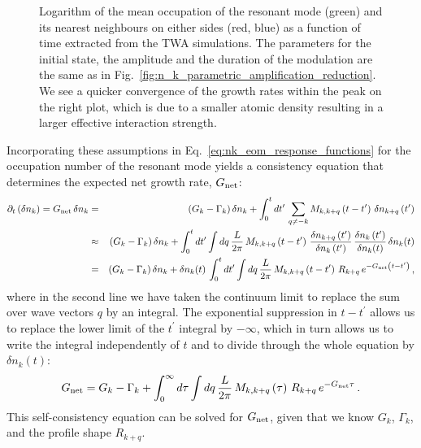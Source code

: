 \documentclass[aps,prd,notitlepage,amsfonts,amssymb,amsmath,nofootinbib,superscriptaddress,longbibliography]{revtex4-2}
\begin{document}
\begin{appendices}
\begin{figure}
\begin{minipage}{0.49\textwidth}
    \end{minipage}
    \caption{
    Logarithm of the mean occupation of the resonant mode (green) and its nearest neighbours on either sides (red, blue) as a function of time extracted from the TWA simulations. The parameters for the initial state, the amplitude and the duration of the modulation are the same as in Fig.~\ref{fig:n_k_parametric_amplification_reduction}. We see a quicker convergence of the growth rates within the peak on the right plot, which is due to a smaller atomic density resulting in a larger effective interaction strength.
    \label{fig:log_nk_different_asap}
    }
\end{figure}


Incorporating these assumptions in Eq.~\eqref{eq:nk_eom_response_functions} for the occupation number of the resonant mode yields a consistency equation that determines the expected net growth rate, $G_{\rm net}$:
\begin{eqnarray}
    \partial_{t}\left(\delta n_{k}\right) = G_{\rm net} \, \delta n_{k} &=& \left( G_{k} - \Gamma_{k} \right) \delta n_{k} + \int_{0}^{t} dt^{\prime} \, \sum_{q \neq -k} M_{k,k+q}\left(t-t^{\prime}\right) \, \delta n_{k+q}\left(t^{\prime}\right) \nonumber \\
    &\approx& \left(G_{k}-\Gamma_{k}\right) \delta n_{k} + \int_{0}^{t} dt^{\prime} \int dq \, \frac{L}{2\pi} \, M_{k,k+q}\left(t-t^{\prime}\right) \, \frac{\delta n_{k+q}\left(t^{\prime}\right)}{\delta n_{k}\left(t^{\prime}\right)} \, \frac{\delta n_{k}\left(t^{\prime}\right)}{\delta n_{k}(t)} \, \delta n_{k}(t) \nonumber \\
    &=& \left(G_{k}-\Gamma_{k}\right) \delta n_{k} + \delta n_{k}(t) \, \int_{0}^{t} dt^{\prime} \int dq \, \frac{L}{2\pi} \, M_{k,k+q}\left(t-t^{\prime}\right) \, R_{k+q} \, e^{-G_{\rm net}\left(t-t^{\prime}\right)} \,,
\end{eqnarray}
where in the second line we have taken the continuum limit to replace the sum over wave vectors $q$ by an integral.  The exponential suppression in $t-t^{\prime}$ allows us to replace the lower limit of the $t^{\prime}$ integral by $-\infty$, which in turn allows us to write the integral independently of $t$ and to divide through the whole equation by $\delta n_{k}(t)$:
\begin{equation}
    G_{\rm net} = G_{k}-\Gamma_{k} + \int_{0}^{\infty} d\tau \int dq \, \frac{L}{2\pi} \, M_{k,k+q}\left(\tau\right) \, R_{k+q} \, e^{-G_{\rm net} \tau} \,.
\end{equation}
This self-consistency equation can be solved for $G_{\rm net}$, given that we know $G_{k}$, $\Gamma_{k}$, and the profile shape $R_{k+q}$.

\end{appendices}
\end{document}
